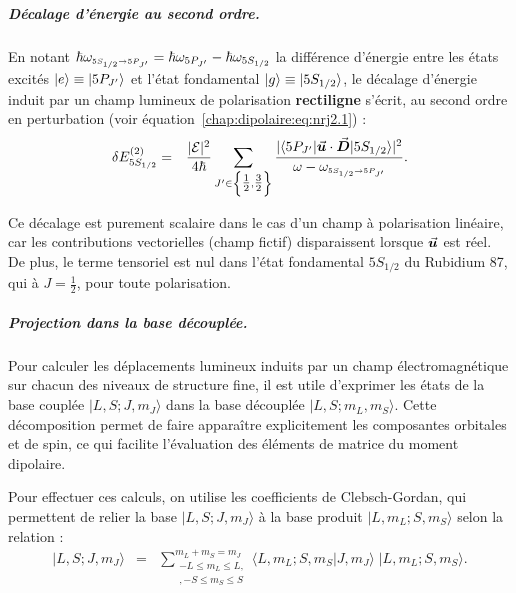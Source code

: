 \subparagraph{Décalage d’énergie au second ordre.}

En notant $\hbar\omega_{\scriptscriptstyle \tiny 5S_{1/2} \rightarrow 5P_{J'}} = \hbar\omega_{5P_{J'}} - \hbar\omega_{5S_{1/2}}$ la différence d’énergie entre les états excités $\ket{e} \equiv \ket{5P_{J'}}$ et l’état fondamental $\ket{g} \equiv \ket{5S_{1/2}}$, le décalage d’énergie induit par un champ lumineux de polarisation \textbf{rectiligne} s’écrit, au second ordre en perturbation (voir équation~\eqref{chap:dipolaire:eq:nrj2.1}) :
\begin{eqnarray}
	\delta E_{5S_{1/2}}^{(2)} & = & \frac{|\mathcal{E}|^2}{4\hbar} \sum_{J' \in \left\{ \tfrac{1}{2}, \tfrac{3}{2} \right\}} 
		\frac{|\langle 5P_{J'}|\vec{{\bm{u}}} \cdot \vec{{\bm{D}}}|5S_{1/2}\rangle|^2}{\omega - \omega_{\scriptscriptstyle  \tiny 5S_{1/2} \rightarrow 5P_{J'}}}.
	\label{chap:dipolaire:eq:nrj2.3}
\end{eqnarray}


Ce décalage est purement scalaire dans le cas d’un champ à polarisation linéaire, 
car les contributions vectorielles (champ fictif) disparaissent lorsque $\vec{{\bm{u}}}$ est réel. 
De plus, le terme tensoriel est nul dans l’état fondamental $5S_{1/2}$ du Rubidium 87, 
qui à $J = \tfrac{1}{2}$, pour toute polarisation.


\subparagraph{Projection dans la base découplée.}

Pour calculer les déplacements lumineux induits par un champ électromagnétique sur chacun des niveaux de structure fine, il est utile d'exprimer les états de la base couplée $|L, S; J, m_J\rangle$ dans la base découplée $|L, S; m_L, m_S\rangle$. Cette décomposition permet de faire apparaître explicitement les composantes orbitales et de spin, ce qui facilite l’évaluation des éléments de matrice du moment dipolaire.

\medskip

Pour effectuer ces calculs, on utilise les coefficients de Clebsch-Gordan, qui permettent de relier la base $|L,S;J,m_J\rangle$ à la base produit $|L,m_L;S,m_S\rangle$ selon la relation :
\begin{eqnarray}
	|L, S; J, m_J\rangle  &=& \sum_{\substack{-L \leq m_L \leq L,\\, -S \leq m_S \leq S  }}^{m_L + m_S = m_J} \langle L, m_L; S, m_S | J, m_J \rangle \; |L, m_L; S, m_S\rangle.
\end{eqnarray}




